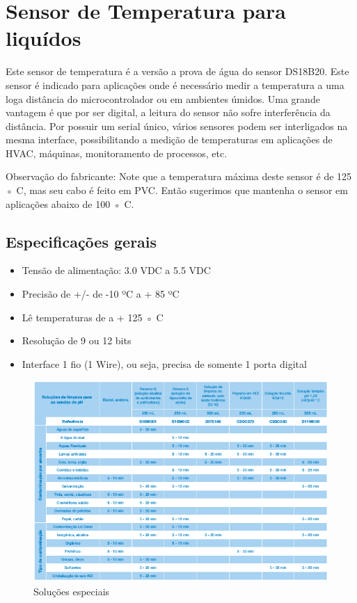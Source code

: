 \section{Sensor de Temperatura para liquídos}

Este sensor de temperatura é a versão a prova de água do sensor DS18B20. Este sensor é indicado
para aplicações onde é necessário medir a temperatura a uma loga distância do microcontrolador
ou em ambientes úmidos. Uma grande vantagem é que por ser digital, a leitura do sensor não sofre
interferência da distância. Por possuir um serial único, vários sensores podem ser interligados na
mesma interface, possibilitando a medição de temperaturas em aplicações de HVAC, máquinas, monitoramento de processos, etc.

Observação do fabricante: Note que a temperatura máxima deste sensor é de 125 ◦ C, mas seu cabo é feito em PVC. Então sugerimos que mantenha o sensor em aplicações abaixo de 100 ◦ C.

\subsection{Especificações gerais}

\begin{itemize}
	\item Tensão de alimentação: 3.0 VDC a 5.5 VDC
	\item Precisão de +/- de -10 ºC a + 85 ºC
	\item Lê temperaturas de a + 125 ◦ C
	\item Resolução de 9 ou 12 bits
	\item Interface 1 fio (1 Wire), ou seja, precisa de somente 1 porta digital
\end{itemize}

\begin{figure}[H]
	\centering
	\includegraphics[width=16cm]{figuras/solucoes_especiais.png}
	\caption{Soluções especiais}
	\label{solucoes_especiais}
\end{figure}


